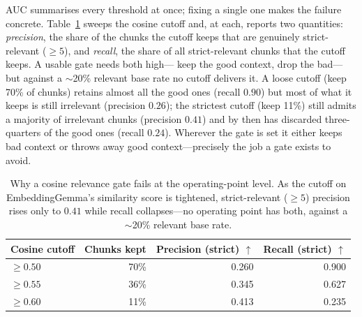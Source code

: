 AUC summarises every threshold at once; fixing a single one makes the failure
concrete. Table~\ref{tab:gate} sweeps the cosine cutoff and, at each, reports
two quantities: \emph{precision}, the share of the chunks the cutoff keeps that
are genuinely strict-relevant ($\ge5$), and \emph{recall}, the share of all
strict-relevant chunks that the cutoff keeps. A usable gate needs both high---%
keep the good context, drop the bad---but against a $\sim$20\% relevant base
rate no cutoff delivers it. A loose cutoff (keep 70\% of chunks) retains almost
all the good ones (recall $0.90$) but most of what it keeps is still irrelevant
(precision $0.26$); the strictest cutoff (keep 11\%) still admits a majority of
irrelevant chunks (precision $0.41$) and by then has discarded three-quarters
of the good ones (recall $0.24$). Wherever the gate is set it either keeps bad
context or throws away good context---precisely the job a gate exists to
avoid.

\begin{table}[t]
\caption{Why a cosine relevance gate fails at the operating-point level. As
the cutoff on EmbeddingGemma's similarity score is tightened, strict-relevant
($\ge5$) precision rises only to $0.41$ while recall collapses---no operating
point has both, against a $\sim$20\% relevant base rate.}
\label{tab:gate}
\centering
\small
\begin{tabular}{@{}lrrr@{}}
\toprule
Cosine cutoff & Chunks kept & \makecell{Precision\\(strict) $\uparrow$} & \makecell{Recall\\(strict) $\uparrow$} \\
\midrule
$\ge 0.50$ & 70\% & 0.260 & 0.900 \\
$\ge 0.55$ & 36\% & 0.345 & 0.627 \\
$\ge 0.60$ & 11\% & 0.413 & 0.235 \\
\bottomrule
\end{tabular}
\end{table}

